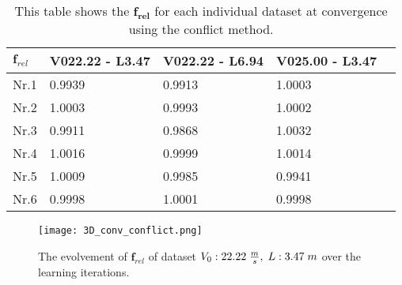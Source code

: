\begin{table}[h!]
	\centering
	\begin{tabular}{@{}llllr@{}} \toprule
		$\bm{f}_{rel}$    & V022.22 - L3.47 & V022.22 - L6.94 & V025.00 - L3.47\\ \midrule
		Nr.1       		  &0.9939       & 0.9913 	    & 1.0003 		\\
		Nr.2              & 1.0003       & 0.9993       & 1.0002       \\
		Nr.3              & 0.9911       & 0.9868       & 1.0032      \\
		Nr.4              & 1.0016       & 0.9999       & 1.0014       \\
		Nr.5              & 1.0009       & 0.9985       & 0.9941       \\
		Nr.6              & 0.9998       & 1.0001       & 0.9998       \\ \bottomrule
	\end{tabular}
	\caption{This table shows the $\bm{f_{rel}}$ for each individual dataset at convergence using the conflict method.}
	\label{tab:in_conflict}
\end{table} 


\begin{figure}[h!]
	\centering
	\texttt{[image: 3D\_conv\_conflict.png]}
	\caption{The evolvement of $\bm{f}_{rel}$ of dataset  $V_0:22.22\hspace{1mm}\frac{m}{s},\hspace{1mm} L:3.47\hspace{1mm}m$ over the learning iterations.}
	\label{fig:3D_conv_conflict}
\end{figure}

